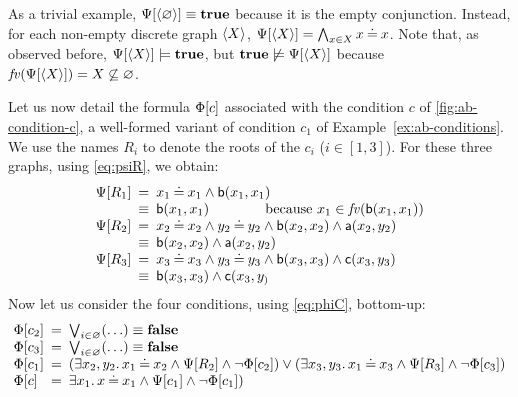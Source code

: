 \begin{example}\label{ex:from-ab-to-FOL}
As a trivial example, $\Psi[{\langle \varnothing \rangle}] \equiv \textbf{true}$ because it is the empty conjunction. Instead, for each non-empty discrete graph $\langle X \rangle$, $\Psi[{\langle X \rangle}] =
\bigwedge_{x\in X}{x\mathbin{\doteq} x}$. Note that, as observed before, $\Psi[{\langle X \rangle}] \models \textbf{true}$, but $\textbf{true}  \not \models \Psi[{\langle X \rangle}]$ because  $\mathit{fv}(\Psi[{\langle X \rangle}]) = X \not \subseteq \varnothing$. 

Let us now detail the formula $\Phi[{c}]$ associated with the condition $c$ of \cref{fig:ab-condition-c}, a well-formed variant of condition $c_1$ of Example~\ref{ex:ab-conditions}.  We use the names $R_i$ to denote the roots of the $c_i$ ($i\in [1,3]$).
%
For these three graphs, using \eqref{eq:psiR}, we obtain:
%
\[\begin{array}{l@{{\enspace}}c@{{\enspace}}l}
\grtofol {R_1}
 & = & x_1 \Eq x_1 \land \lb(x_1,x_1) \\
 & \equiv & \lb(x_1,x_1) \qquad\qquad \text{because $x_1\in \fv(\lb(x_1,x_1))$} \\
\grtofol {R_2}
 & = & x_2 \Eq x_2 \land y_2 \Eq y_2 \land \lb(x_2,x_2)\land \la(x_2,y_2) \\ 
 & \equiv & \lb(x_2,x_2)\land \la(x_2,y_2) \\
\grtofol {R_3}
 & = & x_3 \Eq x_3 \land y_3 \Eq y_3 \land \lb(x_3,x_3)\land \lc(x_3,y_3) \\
 & \equiv & \lb(x_3,x_3)\land \lc(x_3,y_) 
\end{array}\]
%
Now let us consider the four conditions, using \eqref{eq:phiC}, bottom-up:%
%
\[\begin{array}{@{}l@{{\enspace}}c@{{\enspace}}l@{}}
\tofol {c_2}
 & = & \textstyle\bigvee_{i \in \varnothing} (\ldots) \equiv \False \\
\tofol {c_3}
 & = & \textstyle\bigvee_{i \in \varnothing} (\ldots) \equiv \False \\
\tofol {c_1}
 & = & (\exists x_2,y_2\st x_1 \Eq x_2 \land \grtofol{R_2} \land \neg \tofol{c_2})
       \vee (\exists x_3,y_3\st x_1 \Eq x_3 \land \grtofol{R_3} \land \neg \tofol{c_3}) \\
 \tofol {c}
 & = & \exists x_1\st x \Eq x_1 \land \grtofol {c_1} \land \neg \tofol {c_1})
\end{array}\]

\end{example}
